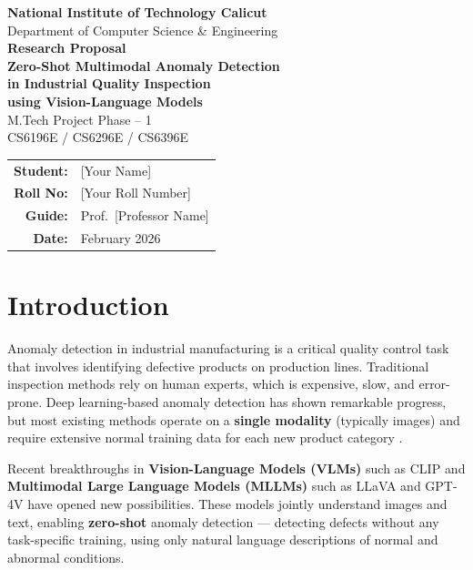 \documentclass[12pt, a4paper]{article}
\begin{document}
\begin{center}
    {\large \textbf{National Institute of Technology Calicut}}\\[0.3cm]
    {\normalsize Department of Computer Science \& Engineering}\\[1.5cm]
    
    {\Large \textbf{Research Proposal}}\\[0.8cm]
    
    {\LARGE \textbf{Zero-Shot Multimodal Anomaly Detection\\[0.3cm] in Industrial Quality Inspection\\[0.3cm] using Vision-Language Models}}\\[1.5cm]
    
    {\large M.Tech Project Phase -- 1}\\[0.5cm]
    {\large CS6196E / CS6296E / CS6396E}\\[1.5cm]
    
    \begin{tabular}{rl}
        \textbf{Student:} & [Your Name] \\
        \textbf{Roll No:} & [Your Roll Number] \\
        \textbf{Guide:} & Prof.\ [Professor Name] \\
        \textbf{Date:} & February 2026 \\
    \end{tabular}
\end{center}

\newpage

\section{Introduction}

Anomaly detection in industrial manufacturing is a critical quality control task that involves identifying defective products on production lines. Traditional inspection methods rely on human experts, which is expensive, slow, and error-prone. Deep learning-based anomaly detection has shown remarkable progress, but most existing methods operate on a \textbf{single modality} (typically images) and require extensive normal training data for each new product category \cite{bergmann2019mvtec}.

Recent breakthroughs in \textbf{Vision-Language Models (VLMs)} such as CLIP \cite{radford2021clip} and \textbf{Multimodal Large Language Models (MLLMs)} such as LLaVA \cite{liu2023llava} and GPT-4V have opened new possibilities. These models jointly understand images and text, enabling \textbf{zero-shot} anomaly detection --- detecting defects without any task-specific training, using only natural language descriptions of normal and abnormal conditions.
\end{document}
